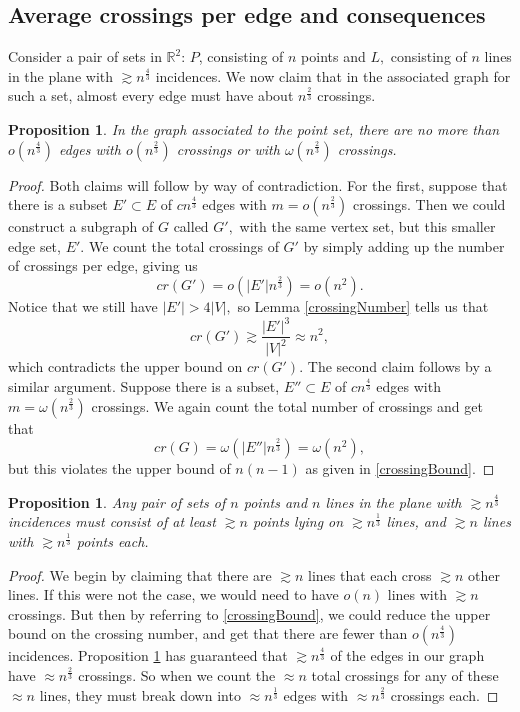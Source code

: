 \documentclass[12pt]{article}
\newtheorem{proposition}[theorem]{Proposition}
\begin{document}
\subsection{Average crossings per edge and consequences}
Consider a pair of sets in $\mathbb R^2$: $P$, consisting of $n$ points and $L,$ consisting of $n$ lines in the plane with $\gtrsim n^\frac{4}{3}$ incidences. We now claim that in the associated graph for such a set, almost every edge must have about $n^\frac{2}{3}$ crossings.
\begin{proposition}\label{avgCrossings}
In the graph associated to the point set, there are no more than $o\left(n^\frac{4}{3}\right)$ edges with $o\left( n^\frac{2}{3}\right)$ crossings or with $\omega\left(n^\frac{2}{3}\right)$ crossings.
\end{proposition}
\begin{proof}
Both claims will follow by way of contradiction. For the first, suppose that there is a subset $E' \subset E$ of $cn^\frac{4}{3}$ edges with $m = o\left(n^\frac{2}{3}\right)$ crossings. Then we could construct a subgraph of $G$ called $G',$ with the same vertex set, but this smaller edge set, $E'.$ We count the total crossings of $G'$ by simply adding up the number of crossings per edge, giving us
$$cr(G') = o\left(|E'| n^\frac{2}{3}\right) =o \left(n^2\right).$$
Notice that we still have $|E'|>4|V|,$ so Lemma \ref{crossingNumber} tells us that
$$cr(G')\gtrsim \frac{|E'|^3}{|V|^2}\approx n^2,$$
which contradicts the upper bound on $cr(G').$
The second claim follows by a similar argument. Suppose there is a subset, $E'' \subset E$ of $cn^\frac{4}{3}$ edges with $m =\omega\left(n^\frac{2}{3}\right)$ crossings. We again count the total number of crossings and get that
$$cr(G)=\omega\left(|E''|n^\frac{2}{3}\right)=\omega\left(n^2\right),$$
but this violates the upper bound of $n(n-1)$ as given in \eqref{crossingBound}.
\end{proof}
\begin{proposition}\label{ppl}
Any pair of sets of $n$ points and $n$ lines in the plane with $\gtrsim n^\frac{4}{3}$ incidences must consist of at least $\gtrsim n$ points lying on $\gtrsim n^\frac{1}{3}$ lines, and $\gtrsim n$ lines with $\gtrsim n^\frac{1}{3}$ points each.
\end{proposition}
\begin{proof}
We begin by claiming that there are $\gtrsim n$ lines that each cross $\gtrsim n$ other lines. If this were not the case, we would need to have $o(n)$ lines with $\gtrsim n$ crossings. But then by referring to \eqref{crossingBound}, we could reduce the upper bound on the crossing number, and get that there are fewer than $o\left(n^\frac{4}{3}\right)$ incidences. Proposition \ref{avgCrossings} has guaranteed that $\gtrsim n^\frac{4}{3}$ of the edges in our graph have $\approx n^\frac{2}{3}$ crossings. So when we count the $\approx n$ total crossings for any of these $\approx n$ lines, they must break down into $\approx n^\frac{1}{3}$ edges with $\approx n^\frac{2}{3}$ crossings each.
\end{proof}
\end{document}
